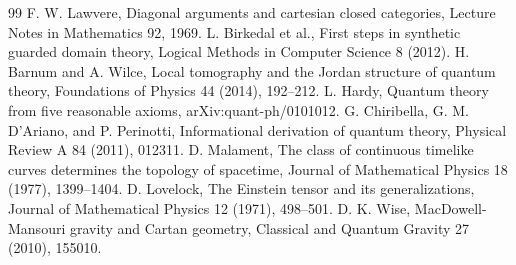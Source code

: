 \documentclass[11pt,a4paper]{article}
\begin{document}
\begin{thebibliography}{99}
 F. W. Lawvere, Diagonal arguments and cartesian closed categories, Lecture Notes in Mathematics 92, 1969.
 L. Birkedal et al., First steps in synthetic guarded domain theory, Logical Methods in Computer Science 8 (2012).
 H. Barnum and A. Wilce, Local tomography and the Jordan structure of quantum theory, Foundations of Physics 44 (2014), 192--212.
 L. Hardy, Quantum theory from five reasonable axioms, arXiv:quant-ph/0101012.
 G. Chiribella, G. M. D'Ariano, and P. Perinotti, Informational derivation of quantum theory, Physical Review A 84 (2011), 012311.
 D. Malament, The class of continuous timelike curves determines the topology of spacetime, Journal of Mathematical Physics 18 (1977), 1399--1404.
 D. Lovelock, The Einstein tensor and its generalizations, Journal of Mathematical Physics 12 (1971), 498--501.
 D. K. Wise, MacDowell-Mansouri gravity and Cartan geometry, Classical and Quantum Gravity 27 (2010), 155010.
\end{thebibliography}
\end{document}
